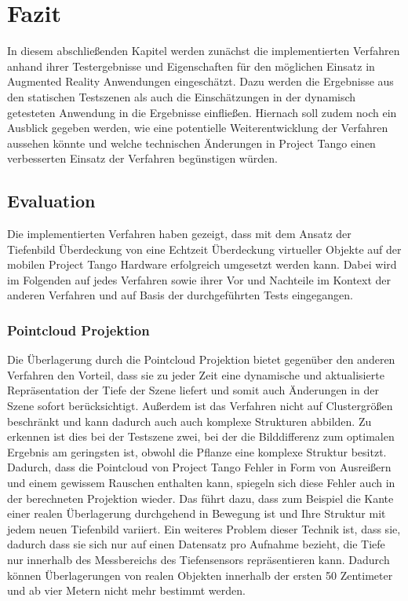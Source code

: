 \chapter{Fazit} \label{sec:conclusion}

In diesem abschließenden Kapitel werden zunächst die implementierten Verfahren anhand ihrer Testergebnisse und Eigenschaften für den möglichen Einsatz in Augmented Reality Anwendungen eingeschätzt. Dazu werden die Ergebnisse aus den statischen Testszenen als auch die Einschätzungen in der dynamisch getesteten Anwendung in die Ergebnisse einfließen. Hiernach soll zudem noch ein Ausblick gegeben werden, wie eine potentielle Weiterentwicklung der Verfahren aussehen könnte und welche technischen Änderungen in Project Tango einen verbesserten Einsatz der Verfahren begünstigen würden.

\section{Evaluation}

Die implementierten Verfahren haben gezeigt, dass mit dem Ansatz der Tiefenbild Überdeckung von \citet{wloka1995resolving} eine Echtzeit Überdeckung virtueller Objekte auf der mobilen Project Tango Hardware erfolgreich umgesetzt werden kann. Dabei wird im Folgenden auf jedes Verfahren sowie ihrer Vor und Nachteile im Kontext der anderen Verfahren und auf Basis der durchgeführten Tests eingegangen. 

\subsection*{Pointcloud Projektion}

Die Überlagerung durch die Pointcloud Projektion bietet gegenüber den anderen Verfahren den Vorteil, dass sie zu jeder Zeit eine dynamische und aktualisierte Repräsentation der Tiefe der Szene liefert und somit auch Änderungen in der Szene sofort berücksichtigt. Außerdem ist das Verfahren nicht auf Clustergrößen beschränkt und kann dadurch auch auch komplexe Strukturen abbilden. Zu erkennen ist dies bei der Testszene zwei, bei der die Bilddifferenz zum optimalen Ergebnis am geringsten ist, obwohl die Pflanze eine komplexe Struktur besitzt.\\

Dadurch, dass die Pointcloud von Project Tango Fehler in Form von Ausreißern und einem gewissem Rauschen enthalten kann, spiegeln sich diese Fehler auch in der berechneten Projektion wieder. Das führt dazu, dass zum Beispiel die Kante einer realen Überlagerung durchgehend in Bewegung ist und Ihre Struktur mit jedem neuen Tiefenbild variiert. Ein weiteres Problem dieser Technik ist, dass sie, dadurch dass sie sich nur auf einen Datensatz pro Aufnahme bezieht, die Tiefe nur innerhalb des Messbereichs des Tiefensensors repräsentieren kann. Dadurch können Überlagerungen von realen Objekten innerhalb der ersten 50 Zentimeter und ab vier Metern nicht mehr bestimmt werden.\\

